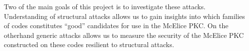 Two of the main goals of this project is to investigate these attacks. Understanding of structural attacks allows us to gain insights into which families of codes constitutes ``good'' candidates for use in the McElice PKC. On the otherhand generic attacks allows us to measure the security of the McElice PKC constructed on these codes resilient to structural attacks.

